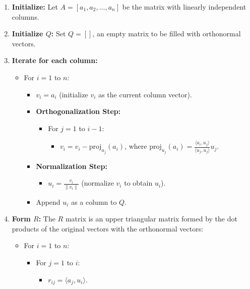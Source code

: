 \begin{enumerate}
    \item \textbf{Initialize:} Let $A = [a_1, a_2, \ldots, a_n]$ be the matrix with linearly independent columns.
    
    \item \textbf{Initialize $Q$:} Set $Q = []$, an empty matrix to be filled with orthonormal vectors.
    
    \item \textbf{Iterate for each column:}
    \begin{itemize}
        \item For $i = 1$ to $n$:
        \begin{itemize}
            \item $v_i = a_i$ (initialize $v_i$ as the current column vector).
            \item \textbf{Orthogonalization Step:}
            \begin{itemize}
                \item For $j = 1$ to $i-1$:
                \begin{itemize}
                    \item $v_i = v_i - \text{proj}_{u_j}(a_i)$, where $\text{proj}_{u_j}(a_i) = \frac{\langle a_i, u_j \rangle}{\langle u_j, u_j \rangle}u_j$.
                \end{itemize}
            \end{itemize}
            \item \textbf{Normalization Step:}
            \begin{itemize}
                \item $u_i = \frac{v_i}{\|v_i\|}$ (normalize $v_i$ to obtain $u_i$).
            \end{itemize}
            \item Append $u_i$ as a column to $Q$.
        \end{itemize}
    \end{itemize}
    
    \item \textbf{Form $R$:} The $R$ matrix is an upper triangular matrix formed by the dot products of the original vectors with the orthonormal vectors:
    \begin{itemize}
        \item For $i = 1$ to $n$:
        \begin{itemize}
            \item For $j = 1$ to $i$:
            \begin{itemize}
                \item $r_{ij} = \langle a_j, u_i \rangle$.
            \end{itemize}
        \end{itemize}
    \end{itemize}
\end{enumerate}

